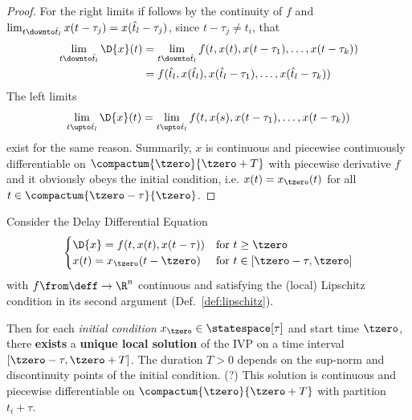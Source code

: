 \begin{proof}
        For the right limits if follows by the continuity of $f$ and $\lim_{t\downto\hat{t}_l} x(t-\tau_j) = x(\hat{t}_l-\tau_j)$, since $t-\tau_j \neq t_i$, that
        \begin{align*}
            \lim_{t\downto\hat{t}_l} \D{x}(t)
            &= \lim_{t\downto\hat{t}_l} f(t,x(t),x(t-\tau_1),\ldots,x(t-\tau_k))\\
            &= f(\hat{t}_l,x(\hat{t}_l),x(\hat{t}_l-\tau_1),\ldots,x(\hat{t}_l-\tau_k))
        \end{align*}
        The left limits
        \begin{equation*}
            \lim_{t\upto\hat{t}_l} \D{x}(t) = \lim_{t\upto\hat{t}_l} f(t,x(s),x(t-\tau_1),\ldots,x(t-\tau_k)) 
        \end{equation*}
        exist for the same reason.
        Summarily, $x$ is continuous and piecewise continuously differentiable on $\compactum{\tzero}{\tzero+T}$ with piecewise derivative $f$ and it obviously obeys the initial condition, i.e. $x(t)=x_{\tzero}(t)$ for all $t\in\compactum{\tzero-\tau}{\tzero}$.
    \end{proof}

    \begin{theorem}\label{thm:solution-existence}
        Consider the Delay Differential Equation
        \begin{equation}
            \begin{cases}
                \D{x} = f(t,x(t),x(t-\tau)) & \text{for } t\geq\tzero\\
                x(t) = x_\tzero(t-\tzero)   & \text{for } t\in [\tzero-\tau,\tzero]
            \end{cases}
        \end{equation}
        with $f\from\deff\to\R^n$ continuous and satisfying the (local) Lipschitz condition in its second argument (Def.~\ref{def:lipschitz}).


        Then for each \emph{initial condition} $x_{\tzero}\in\statespace[\tau]$ and start time $\tzero$, there \textbf{exists} a \textbf{unique local solution} of the IVP on a time interval $[\tzero-\tau, \tzero+T]$. The duration $T>0$ depends on the sup-norm and discontinuity points of the initial condition. (?)
        This solution is continuous and piecewise differentiable on $\compactum{\tzero}{\tzero+T}$ with partition $t_i+\tau$.
    \end{theorem}

